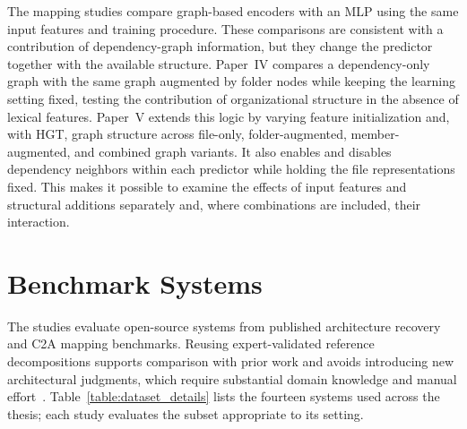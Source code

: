 The mapping studies compare graph-based encoders with an MLP using the same input features and training procedure. These comparisons are consistent with a contribution of dependency-graph information, but they change the predictor together with the available structure. Paper~IV compares a dependency-only graph with the same graph augmented by folder nodes while keeping the learning setting fixed, testing the contribution of organizational structure in the absence of lexical features. Paper~V extends this logic by varying feature initialization and, with HGT, graph structure across file-only, folder-augmented, member-augmented, and combined graph variants. It also enables and disables dependency neighbors within each predictor while holding the file representations fixed. This makes it possible to examine the effects of input features and structural additions separately and, where combinations are included, their interaction.

\section{Benchmark Systems}
\label{sec:data}
The studies evaluate open-source systems from published architecture recovery and C2A mapping benchmarks. Reusing expert-validated reference decompositions supports comparison with prior work and avoids introducing new architectural judgments, which require substantial domain knowledge and manual effort~\cite{garcia2013}. Table~\ref{table:dataset_details} lists the fourteen systems used across the thesis; each study evaluates the subset appropriate to its setting.

